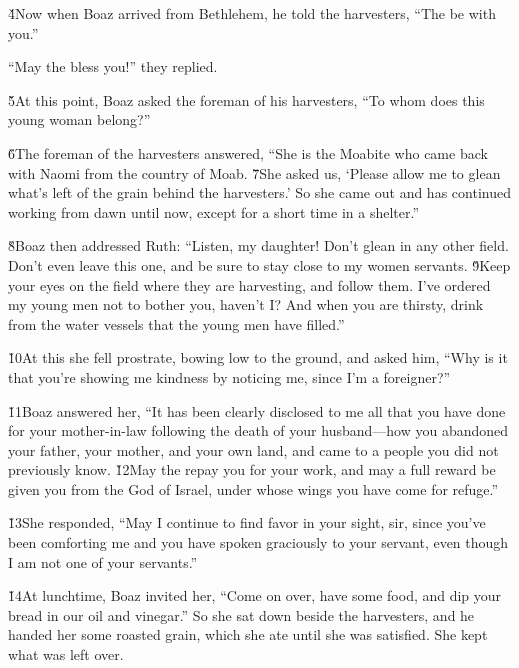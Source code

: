 \v{4}Now when Boaz arrived from Bethlehem, he told the harvesters, ``The  be with you.''

``May the  bless you!'' they replied.

\v{5}At this point, Boaz asked the foreman of his harvesters, ``To whom does this young woman belong?''

\v{6}The foreman of the harvesters answered, ``She is the Moabite who came back with Naomi from the country of Moab. \v{7}She asked us, `Please allow me to glean what's left of the grain behind the harvesters.' So she came out and has continued working from dawn until now, except for a short time in a shelter.''

\v{8}Boaz then addressed Ruth: ``Listen, my daughter! Don't glean in any other field. Don't even leave this one, and be sure to stay close to my women servants. \v{9}Keep your eyes on the field where they are harvesting, and follow them. I've ordered my young men not to bother you, haven't I? And when you are thirsty, drink from the water vessels that the young men have filled.''

\v{10}At this she fell prostrate, bowing low to the ground, and asked him, ``Why is it that you're showing me kindness by noticing me, since I'm a foreigner?''

\v{11}Boaz answered her, ``It has been clearly disclosed to me all that you have done for your mother-in-law following the death of your husband---how you abandoned your father, your mother, and your own land, and came to a people you did not previously know. \v{12}May the  repay you for your work, and may a full reward be given you from the  God of Israel, under whose wings you have come for refuge.''

\v{13}She responded, ``May I continue to find favor in your sight, sir, since you've been comforting me and you have spoken graciously to your servant, even though I am not one of your servants.''

\v{14}At lunchtime, Boaz invited her, ``Come on over, have some food, and dip your bread in our oil and vinegar.'' So she sat down beside the harvesters, and he handed her some roasted grain, which she ate until she was satisfied. She kept what was left over.

